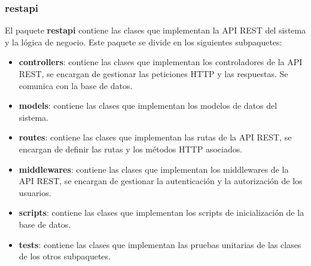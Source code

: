 \subsubsection{restapi}
El paquete \textbf{restapi} contiene las clases que implementan la API REST del sistema y la lógica de negocio. Este paquete se divide en los siguientes subpaquetes:
\begin{itemize}
    \item \textbf{controllers}: contiene las clases que implementan los controladores de la API REST, se encargan de gestionar las peticiones HTTP y las respuestas. Se comunica con la base de datos.
    \item \textbf{models}: contiene las clases que implementan los modelos de datos del sistema.
    \item \textbf{routes}: contiene las clases que implementan las rutas de la API REST, se encargan de definir las rutas y los métodos HTTP asociados.
    \item \textbf{middlewares}: contiene las clases que implementan los middlewares de la API REST, se encargan de gestionar la autenticación y la autorización de los usuarios.
    \item \textbf{scripts}: contiene las clases que implementan los scripts de inicialización de la base de datos.
    \item \textbf{tests}: contiene las clases que implementan las pruebas unitarias de las clases de los otros subpaquetes.
\end{itemize}



